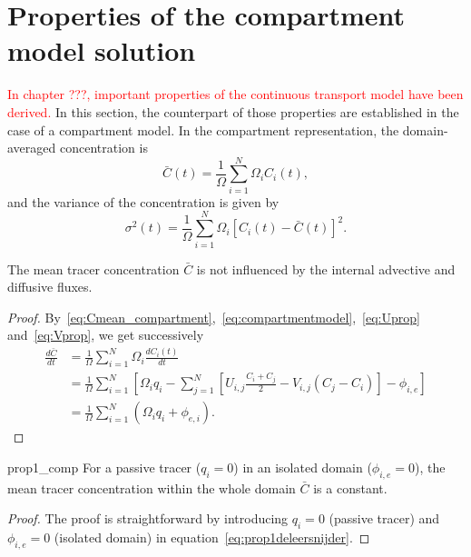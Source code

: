 \section{Properties of the compartment model solution} \label{sec:prop_comp}
\textcolor{red}{In chapter ???, important properties of the continuous transport model have been derived.} In this section, the counterpart of those properties are established in the case of a compartment model. In the compartment representation, the domain-averaged concentration is
\begin{equation} \label{eq:Cmean_compartment}
	\bar{C}(t) = \frac{1}{\Omega} \sum_{i=1}^N \Omega_i C_i(t),
\end{equation}
and the variance of the concentration is given by
\begin{equation}
	\sigma^2(t) = \frac{1}{\Omega} \sum_{i=1}^{N} \Omega_i \left[C_i(t) - \bar{C}(t)\right]^2.
\end{equation}

\begin{property} \label{prop1_comp}
	The mean tracer concentration $\bar C$ is not influenced by the internal advective and diffusive fluxes.
\end{property}
\begin{proof}
	By~\eqref{eq:Cmean_compartment},~\eqref{eq:compartmentmodel},~\eqref{eq:Uprop} and~\eqref{eq:Vprop}, we get successively
	\begin{subequations}
	\begin{align}
		\frac{d\bar{C}}{dt} &= \frac{1}{\Omega} \sum_{i=1}^N \Omega_i \frac{dC_i(t)}{dt}\\
			&= \frac{1}{\Omega} \sum_{i=1}^N \left[\Omega_i q_i - \sum_{j=1}^N \left[ U_{i,j}\frac{C_i + C_j}{2} - V_{i,j} (C_j-C_i)\right] - \phi_{i,e} \right]\\
			&= \frac{1}{\Omega} \sum_{i=1}^N(\Omega_i q_i + \phi_{e,i}). \label{eq:prop1deleersnijder}
	\end{align}
	\end{subequations}
\end{proof}

\begin{corollary}{prop1_comp}
	For a passive tracer ($q_i = 0$) in an isolated domain ($\phi_{i,e} = 0$), the mean tracer concentration within the whole domain $\bar C$ is a constant.
\end{corollary}
\begin{proof}
	The proof is straightforward by introducing $q_i = 0$ (passive tracer) and $\phi_{i,e} = 0$ (isolated domain) in equation~\eqref{eq:prop1deleersnijder}.	
\end{proof}

